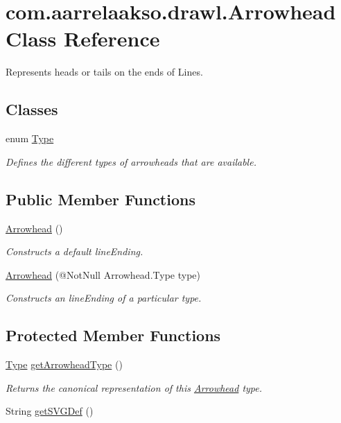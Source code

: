 \hypertarget{classcom_1_1aarrelaakso_1_1drawl_1_1_arrowhead}{}\section{com.\+aarrelaakso.\+drawl.\+Arrowhead Class Reference}
\label{classcom_1_1aarrelaakso_1_1drawl_1_1_arrowhead}


Represents heads or tails on the ends of Lines.  


\subsection*{Classes}
\begin{DoxyCompactItemize}
\item 
enum \hyperlink{enumcom_1_1aarrelaakso_1_1drawl_1_1_arrowhead_1_1_type}{Type}
\begin{DoxyCompactList}\small\item\em Defines the different types of arrowheads that are available. \end{DoxyCompactList}\end{DoxyCompactItemize}
\subsection*{Public Member Functions}
\begin{DoxyCompactItemize}
\item 
\hyperlink{classcom_1_1aarrelaakso_1_1drawl_1_1_arrowhead_a866fb3900ad67226bad5962031cc7817}{Arrowhead} ()
\begin{DoxyCompactList}\small\item\em Constructs a default lineEnding. \end{DoxyCompactList}\item
\hyperlink{classcom_1_1aarrelaakso_1_1drawl_1_1_arrowhead_a43464dd3355fda0d6e295d4282433828}{Arrowhead} (@Not\+Null Arrowhead.\+Type type)
\begin{DoxyCompactList}\small\item\em Constructs an lineEnding of a particular type. \end{DoxyCompactList}\end{DoxyCompactItemize}
\subsection*{Protected Member Functions}
\begin{DoxyCompactItemize}
\item 
\hyperlink{enumcom_1_1aarrelaakso_1_1drawl_1_1_arrowhead_1_1_type}{Type} \hyperlink{classcom_1_1aarrelaakso_1_1drawl_1_1_arrowhead_a9826ae8d6876c83ff6e61f12b5afcd1a}{get\+Arrowhead\+Type} ()
\begin{DoxyCompactList}\small\item\em Returns the canonical representation of this \hyperlink{classcom_1_1aarrelaakso_1_1drawl_1_1_arrowhead}{Arrowhead} type. \end{DoxyCompactList}\item 
String \hyperlink{classcom_1_1aarrelaakso_1_1drawl_1_1_arrowhead_a0094c4f48945d782b7e474b15ef06561}{get\+S\+V\+G\+Def} ()
\end{DoxyCompactItemize}
